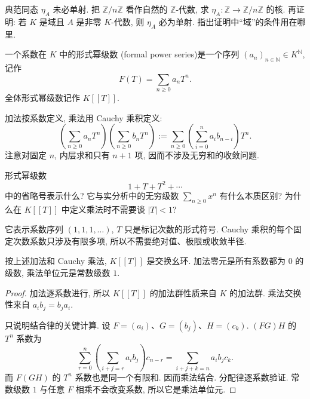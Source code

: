 \documentclass[usesamecnt, thmcnt=section, lang=cn, newtx, 10pt, scheme=chinese]{elegantbook}
\begin{document}
\begin{exercise}\label{ex:alg-K-algebra-injective}
典范同态 $\eta_A$ 未必单射. 把 $\mathbb Z/n\mathbb Z$ 看作自然的 $\mathbb Z$-代数, 求 $\eta_A:\mathbb Z\to\mathbb Z/n\mathbb Z$ 的核. 再证明: 若 $K$ 是域且 $A$ 是非零 $K$-代数, 则 $\eta_A$ 必为单射. 指出证明中``域''的条件用在哪里.
\end{exercise}

\begin{definition}[形式幂级数]\label{def:alg-formal-series}
一个系数在 $K$ 中的{\color{blue}形式幂级数 (formal power series)}是一个序列 $(a_n)_{n\in\mathbb N}\in K^{\mathbb N}$, 记作
\[
 F(T)=\sum_{n\geq0}a_nT^n.
\]
全体形式幂级数记作 $K[\![T]\!]$.

加法按系数定义, 乘法用 Cauchy 乘积定义:
\[
 \left(\sum_{n\geq0}a_nT^n\right)
 \left(\sum_{n\geq0}b_nT^n\right)
 :=\sum_{n\geq0}\left(\sum_{i=0}^{n}a_i b_{n-i}\right)T^n.
\]
注意对固定 $n$, 内层求和只有 $n+1$ 项, 因而不涉及无穷和的收敛问题.
\end{definition}

\begin{concept}\label{con:alg-series-01}
形式幂级数
\[
 1+T+T^2+\cdots
\]
中的省略号表示什么? 它与实分析中的无穷级数 $\sum_{n\geq0}x^n$ 有什么本质区别? 为什么在 $K[\![T]\!]$ 中定义乘法时不需要谈 $|T|<1$?
\end{concept}

\begin{solution}
它表示系数序列 $(1,1,1,\ldots)$, $T$ 只是标记次数的形式符号. Cauchy 乘积的每个固定次数系数只涉及有限多项, 所以不需要绝对值、极限或收敛半径.
\end{solution}

\begin{proposition}\label{prop:alg-series-ring}
按上述加法和 Cauchy 乘法, $K[\![T]\!]$ 是交换幺环. 加法零元是所有系数都为 $0$ 的级数, 乘法单位元是常数级数 $1$.
\end{proposition}

\begin{proof}
加法逐系数进行, 所以 $K[\![T]\!]$ 的加法群性质来自 $K$ 的加法群. 乘法交换性来自 $a_ib_j=b_ja_i$.

只说明结合律的关键计算. 设 $F=(a_i)$、$G=(b_j)$、$H=(c_k)$. $(FG)H$ 的 $T^n$ 系数为
\[
 \sum_{r=0}^n\left(\sum_{i+j=r}a_ib_j\right)c_{n-r}
 =\sum_{i+j+k=n}a_ib_jc_k.
\]
而 $F(GH)$ 的 $T^n$ 系数也是同一个有限和. 因而乘法结合. 分配律逐系数验证. 常数级数 $1$ 与任意 $F$ 相乘不会改变系数, 所以它是乘法单位元.
\end{proof}
\end{document}
